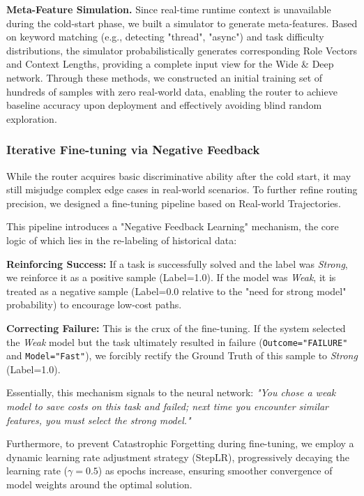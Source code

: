 \documentclass{article}
\theoremstyle{plain}
\theoremstyle{definition}
\theoremstyle{remark}
\begin{document}
\textbf{Meta-Feature Simulation.} Since real-time runtime context is unavailable during the cold-start phase, we built a simulator to generate meta-features. Based on keyword matching (e.g., detecting "thread", "async") and task difficulty distributions, the simulator probabilistically generates corresponding Role Vectors and Context Lengths, providing a complete input view for the Wide \& Deep network. Through these methods, we constructed an initial training set of hundreds of samples with zero real-world data, enabling the router to achieve baseline accuracy upon deployment and effectively avoiding blind random exploration.

\subsubsection{Iterative Fine-tuning via Negative Feedback}

While the router acquires basic discriminative ability after the cold start, it may still misjudge complex edge cases in real-world scenarios. To further refine routing precision, we designed a fine-tuning pipeline based on Real-world Trajectories.

This pipeline introduces a "Negative Feedback Learning" mechanism, the core logic of which lies in the re-labeling of historical data:

\textbf{Reinforcing Success:} If a task is successfully solved and the label was \textit{Strong}, we reinforce it as a positive sample (Label=1.0). If the model was \textit{Weak}, it is treated as a negative sample (Label=0.0 relative to the "need for strong model" probability) to encourage low-cost paths.

\textbf{Correcting Failure:} This is the crux of the fine-tuning. If the system selected the \textit{Weak} model but the task ultimately resulted in failure (\verb|Outcome="FAILURE"| and \verb|Model="Fast"|), we forcibly rectify the Ground Truth of this sample to \textit{Strong} (Label=1.0).

Essentially, this mechanism signals to the neural network: \textit{"You chose a weak model to save costs on this task and failed; next time you encounter similar features, you must select the strong model."}

Furthermore, to prevent Catastrophic Forgetting during fine-tuning, we employ a dynamic learning rate adjustment strategy (StepLR), progressively decaying the learning rate ($\gamma=0.5$) as epochs increase, ensuring smoother convergence of model weights around the optimal solution.
\end{document}
